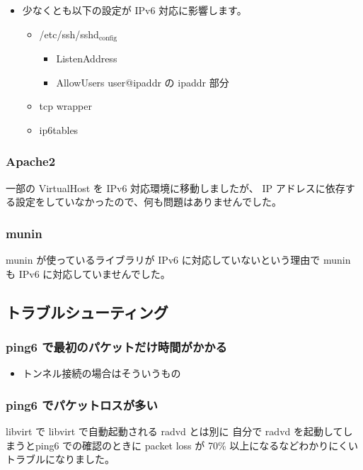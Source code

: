 \documentclass[mingoth,a4paper]{jsarticle}
\begin{document}
\begin{itemize}
\item 少なくとも以下の設定が IPv6 対応に影響します。

\begin{itemize}
\item /etc/ssh/sshd$_{\mathrm{config}}$

\begin{itemize}
\item ListenAddress
\item AllowUsers user@ipaddr の ipaddr 部分
\end{itemize}

\item tcp wrapper
\item ip6tables
\end{itemize}

\end{itemize}
\subsubsection{Apache2}

一部の VirtualHost を IPv6 対応環境に移動しましたが、
IP アドレスに依存する設定をしていなかったので、何も問題はありませんでした。
\subsubsection{munin}

munin が使っているライブラリが IPv6 に対応していないという理由で
munin も IPv6 に対応していませんでした。
\subsection{トラブルシューティング}
\subsubsection{ping6 で最初のパケットだけ時間がかかる}

\begin{itemize}
\item トンネル接続の場合はそういうもの
\end{itemize}
\subsubsection{ping6 でパケットロスが多い}

libvirt で libvirt で自動起動される radvd とは別に
自分で radvd を起動してしまうとping6 での確認のときに
packet loss が 70\% 以上になるなどわかりにくいトラブルになりました。
\end{document}
